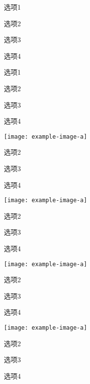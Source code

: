 \documentclass{xdyy-usermanual}
\begin{document}
\begin{vexample}
    \begin{xchoices}[label-pos = bottom-left]
      \item 选项1
      \item 选项2
      \item 选项3
      \item 选项4
    \end{xchoices}
\end{vexample}
\begin{vexample}
    \begin{xchoices}[label-pos = bottom-right]
      \item 选项1
      \item 选项2
      \item 选项3
      \item 选项4
    \end{xchoices}
\end{vexample}
\begin{vexample}
    \begin{xchoices}[label-pos = left]
      \item \texttt{[image: example-image-a]}
      \item 选项2
      \item 选项3
      \item 选项4
    \end{xchoices}
\end{vexample}
\begin{vexample}
    \begin{xchoices}[label-pos = left-center]
      \item \texttt{[image: example-image-a]}
      \item 选项2
      \item 选项3
      \item 选项4
    \end{xchoices}
\end{vexample}
\begin{vexample}
    \begin{xchoices}[label-pos = left-top]
      \item \texttt{[image: example-image-a]}
      \item 选项2
      \item 选项3
      \item 选项4
    \end{xchoices}
\end{vexample}
\begin{vexample}
    \begin{xchoices}[label-pos = left-bottom]
      \item \texttt{[image: example-image-a]}
      \item 选项2
      \item 选项3
      \item 选项4
    \end{xchoices}
\end{vexample}
\end{document}
